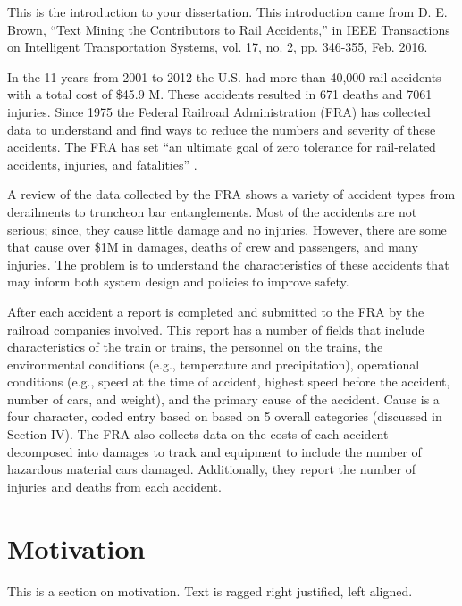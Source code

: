 This is the introduction to your dissertation.  This introduction came from D. E. Brown, ``Text Mining the Contributors to Rail Accidents,'' in IEEE Transactions on Intelligent Transportation Systems, vol. 17, no. 2, pp. 346-355, Feb. 2016.  

In the 11 years from 2001 to 2012 the U.S. had more than 40,000 rail accidents with a total cost of \$45.9 M. These accidents resulted in 671 deaths and 7061 injuries. Since 1975 the Federal Railroad Administration (FRA) has collected data to understand and find ways to reduce the numbers and severity of these accidents. The FRA has set “an ultimate goal of zero tolerance for rail-related accidents, injuries, and fatalities” \cite{fra2009}.

A review of the data collected by the FRA shows a variety of accident types from derailments to truncheon bar entanglements. Most of the accidents are not serious; since, they cause little damage and no injuries. However, there are some that cause over \$1M in damages, deaths of crew and passengers, and many injuries. The problem is to understand the characteristics of these accidents that may inform both system design and policies to improve safety.

After each accident a report is completed and submitted to the FRA by the railroad companies involved. This report has a number of fields that include characteristics of the train or trains, the personnel on the trains, the environmental conditions (e.g., temperature and precipitation), operational conditions (e.g., speed at the time of accident, highest speed before the accident, number of cars, and weight), and the primary cause of the accident. Cause is a four character, coded entry based on based on 5 overall categories (discussed in Section IV). The FRA also collects data on the costs of each accident decomposed into damages to track and equipment to include the number of hazardous material cars damaged. Additionally, they report the number of injuries and deaths from each accident.

\section{Motivation}
This is a section on motivation. Text is ragged right justified, left aligned.